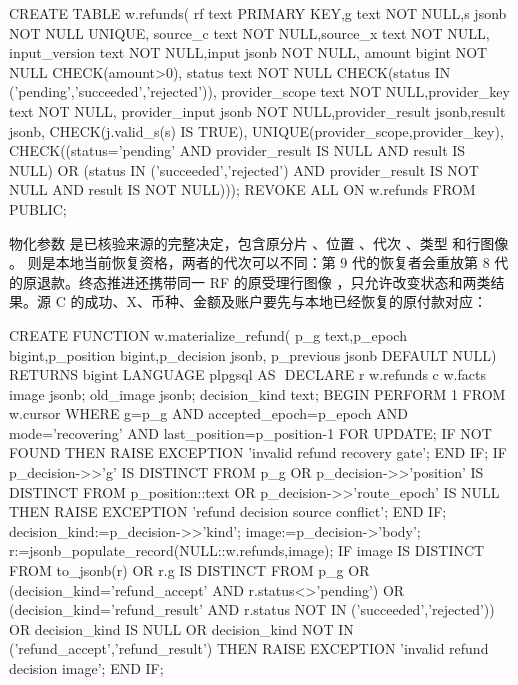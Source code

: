 \begin{BookCode}
CREATE TABLE w.refunds(
 rf text PRIMARY KEY,g text NOT NULL,s jsonb NOT NULL UNIQUE,
 source_c text NOT NULL,source_x text NOT NULL,
 input_version text NOT NULL,input jsonb NOT NULL,
 amount bigint NOT NULL CHECK(amount>0),
 status text NOT NULL CHECK(status IN ('pending','succeeded','rejected')),
 provider_scope text NOT NULL,provider_key text NOT NULL,
 provider_input jsonb NOT NULL,provider_result jsonb,result jsonb,
 CHECK(j.valid_s(s) IS TRUE),
 UNIQUE(provider_scope,provider_key),
 CHECK((status='pending' AND provider_result IS NULL AND result IS NULL)
    OR (status IN ('succeeded','rejected')
        AND provider_result IS NOT NULL AND result IS NOT NULL)));
REVOKE ALL ON w.refunds FROM PUBLIC;
\end{BookCode}

物化参数  是已核验来源的完整决定，包含原分片 、位置 、代次 、类型  和行图像 。 则是本地当前恢复资格，两者的代次可以不同：第 9 代的恢复者会重放第 8 代的原退款。终态推进还携带同一 RF 的原受理行图像 ，只允许改变状态和两类结果。源 C 的成功、X、币种、金额及账户要先与本地已经恢复的原付款对应：

\begin{BookCode}
CREATE FUNCTION w.materialize_refund(
 p_g text,p_epoch bigint,p_position bigint,p_decision jsonb,
 p_previous jsonb DEFAULT NULL) RETURNS bigint
 LANGUAGE plpgsql AS $$
DECLARE r w.refunds%
        c w.facts%
        image jsonb; old_image jsonb; decision_kind text;
BEGIN
 PERFORM 1 FROM w.cursor WHERE g=p_g AND accepted_epoch=p_epoch
   AND mode='recovering' AND last_position=p_position-1 FOR UPDATE;
 IF NOT FOUND THEN RAISE EXCEPTION 'invalid refund recovery gate'; END IF;
 IF p_decision->>'g' IS DISTINCT FROM p_g
    OR p_decision->>'position' IS DISTINCT FROM p_position::text
    OR p_decision->>'route_epoch' IS NULL THEN
   RAISE EXCEPTION 'refund decision source conflict';
 END IF;
 decision_kind:=p_decision->>'kind';
 image:=p_decision->'body';
 r:=jsonb_populate_record(NULL::w.refunds,image);
 IF image IS DISTINCT FROM to_jsonb(r) OR r.g IS DISTINCT FROM p_g
    OR (decision_kind='refund_accept' AND r.status<>'pending')
    OR (decision_kind='refund_result'
        AND r.status NOT IN ('succeeded','rejected'))
    OR decision_kind IS NULL
    OR decision_kind NOT IN ('refund_accept','refund_result') THEN
   RAISE EXCEPTION 'invalid refund decision image';
 END IF;
\end{BookCode}


